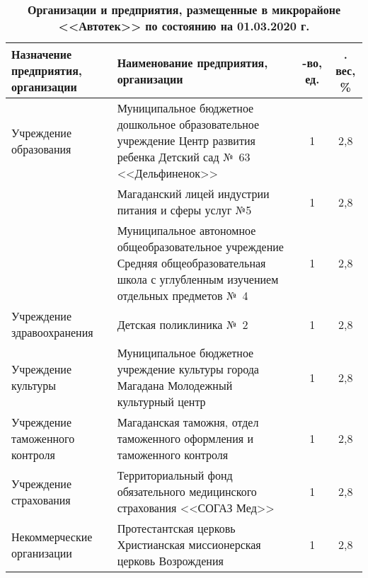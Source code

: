 \begin{table}[h!]
\caption*{\textbf{Организации и предприятия, размещенные в микрорайоне <<Автотек>> по состоянию на 01.03.2020 г.}}
\label{tab:kodirev-tab-1}
\begin{changemargin}{-1cm}{-1cm}
\begin{tabular}{p{5cm}p{7cm}cc}
   \toprule
Назначение предприятия, организации &
Наименование предприятия, организации &
 \parbox[c][][c]{0.1\textwidth}{ -во, ед.} &
  \parbox[c][][c]{0.1\textwidth}{ . вес, \%} \\
   \toprule
Учреждение 				образования              & Муниципальное 				бюджетное дошкольное образовательное 				учреждение Центр развития ребенка 				Детский сад №~63 <<Дельфиненок>>                            & 1               & 2,8               \\
                                        & Магаданский 				лицей индустрии питания и сферы услуг 				№5                                                                                              & 1               & 2,8               \\
                                        & Муниципальное 				автономное общеобразовательное 				учреждение Средняя общеобразовательная 				школа с углубленным изучением отдельных 				предметов №~4 & 1               & 2,8               \\ \midrule
Учреждение 				здравоохранения          & Детская 				поликлиника №~2                                                                                                                               & 1               & 2,8               \\ \midrule
Учреждение 				культуры                 & Муниципальное 				бюджетное учреждение культуры города 				Магадана Молодежный культурный центр                                                           & 1               & 2,8               \\ \midrule
Учреждение 				таможенного контроля     & Магаданская 				таможня, отдел таможенного оформления 				и таможенного контроля                                                                          & 1               & 2,8               \\ \midrule
Учреждение 				страхования              & Территориальный 				фонд обязательного медицинского 				страхования <<СОГАЗ Мед>>                                                                           & 1               & 2,8               \\ \midrule
Некоммерческие 				организации          & Протестантская 				церковь Христианская миссионерская 				церковь Возрождения                                                                             & 1               & 2,8               \\

\end{tabular}
\end{changemargin}
\end{table}
